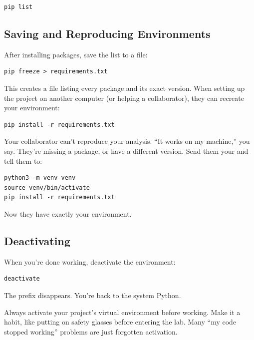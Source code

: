 \begin{lstlisting}[style=shellstyle]
pip list
\end{lstlisting}

\subsection{Saving and Reproducing Environments}

After installing packages, save the list to a file:

\begin{lstlisting}[style=shellstyle]
pip freeze > requirements.txt
\end{lstlisting}

This creates a  file listing every package and its exact version. When setting up the project on another computer (or helping a collaborator), they can recreate your environment:

\begin{lstlisting}[style=shellstyle]
pip install -r requirements.txt
\end{lstlisting}

\begin{labexample}
Your collaborator can't reproduce your analysis. ``It works on my machine,'' you say. They're missing a package, or have a different version. Send them your  and tell them to:
\begin{lstlisting}[style=shellstyle]
python3 -m venv venv
source venv/bin/activate
pip install -r requirements.txt
\end{lstlisting}
Now they have exactly your environment.
\end{labexample}

\subsection{Deactivating}

When you're done working, deactivate the environment:

\begin{lstlisting}[style=shellstyle]
deactivate
\end{lstlisting}

The  prefix disappears. You're back to the system Python.

\begin{tip}
Always activate your project's virtual environment before working. Make it a habit, like putting on safety glasses before entering the lab. Many ``my code stopped working'' problems are just forgotten activation.
\end{tip}

